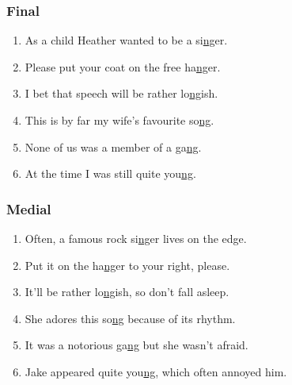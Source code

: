 		\begin{minipage}[t]{0.49\textwidth}
			\subsubsection*{Final}
			\begin{enumerate}\footnotesize
				\item As a child Heather wanted to be a si\uline{ng}er.
				\item Please put your coat on the free ha\uline{ng}er.
				\item I bet that speech will be rather lo\uline{ng}ish.
				\item This is by far my wife's favourite so\uline{ng}.
				\item None of us was a member of a ga\uline{ng}.
				\item At the time I was still quite you\uline{ng}.
			\end{enumerate}
		\end{minipage}
		\begin{minipage}[t]{0.49\textwidth}
			\subsubsection*{Medial}
			\begin{enumerate}\footnotesize
				\item Often, a famous rock si\uline{ng}er lives on the edge.
				\item Put it on the ha\uline{ng}er to your right, please.
				\item It'll be rather lo\uline{ng}ish, so don't fall asleep.
				\item She adores this so\uline{ng} because of its rhythm.
				\item It was a notorious ga\uline{ng} but she wasn't afraid.
				\item Jake appeared quite you\uline{ng}, which often annoyed him.
			\end{enumerate}
		\end{minipage}